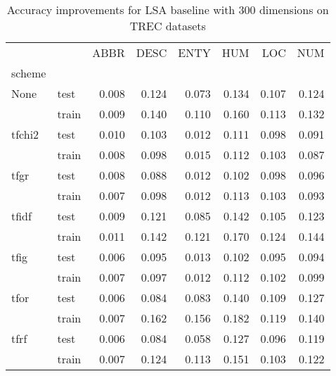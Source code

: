 \begin{table}[H]
\begin{center}

\begin{tabular}{llrrrrrr}
\toprule
{} &  &  ABBR &  DESC &  ENTY &  HUM &  LOC &  NUM \\
scheme &  &       &       &       &      &      &      \\
\midrule
None & test &     0.008 &     0.124 &     0.073 &    0.134 &    0.107 &    0.124 \\
{} & train &     0.009 &     0.140 &     0.110 &    0.160 &    0.113 &    0.132 \\
tfchi2 & test &     0.010 &     0.103 &     0.012 &    0.111 &    0.098 &    0.091 \\
{} & train &     0.008 &     0.098 &     0.015 &    0.112 &    0.103 &    0.087 \\
tfgr & test &     0.008 &     0.088 &     0.012 &    0.102 &    0.098 &    0.096 \\
{} & train &     0.007 &     0.098 &     0.012 &    0.113 &    0.103 &    0.093 \\
tfidf & test &     0.009 &     0.121 &     0.085 &    0.142 &    0.105 &    0.123 \\
{} & train &     0.011 &     0.142 &     0.121 &    0.170 &    0.124 &    0.144 \\
tfig & test &     0.006 &     0.095 &     0.013 &    0.102 &    0.095 &    0.094 \\
{} & train &     0.007 &     0.097 &     0.012 &    0.112 &    0.102 &    0.099 \\
tfor & test &     0.006 &     0.084 &     0.083 &    0.140 &    0.109 &    0.127 \\
{} & train &     0.007 &     0.162 &     0.156 &    0.182 &    0.119 &    0.140 \\
tfrf & test &     0.006 &     0.084 &     0.058 &    0.127 &    0.096 &    0.119 \\
{} & train &     0.007 &     0.124 &     0.113 &    0.151 &    0.103 &    0.122 \\
\bottomrule
\end{tabular}

\caption[Accuracy improvements for LSA baseline with 300 dimensions on TREC datasets]{Accuracy improvements for LSA baseline with 300 dimensions on TREC datasets}
\label{tab:lsa:resuts:300:TREC}
\end{center}
\end{table}





